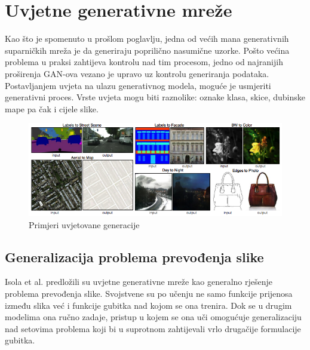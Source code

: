 \documentclass[lmodern, utf8, seminar]{fer}
\begin{document}


\chapter{Uvjetne generativne mreže}
Kao što je spomenuto u prošlom poglavlju, jedna od većih mana generativnih suparničkih mreža je da generiraju poprilično nasumične uzorke. Pošto većina problema u praksi zahtijeva kontrolu nad tim procesom, jedno od najranijih proširenja GAN-ova vezano je upravo uz kontrolu generiranja podataka. Postavljanjem uvjeta na ulazu generativnog modela, moguće je usmjeriti generativni proces. Vrste uvjeta mogu biti raznolike: oznake klasa, skice, dubinske mape pa čak i cijele slike.

\begin{figure}[H]
    \centering
    \includegraphics[width=1\textwidth]{isola2017-conditioned-generation}
    \caption{Primjeri uvjetovane generacije}
    \label{fig:isola2017-conditioned-generation}
\end{figure}


\section{Generalizacija problema prevođenja slike}
Isola et al. \cite{isola2017image} predložili su uvjetne generativne mreže kao generalno rješenje problema prevođenja slike. Svojstvene su po učenju ne samo funkcije prijenosa između slika već i funkcije gubitka nad kojom se ona trenira.
Dok se u drugim modelima ona ručno zadaje, pristup u kojem se ona uči omogućuje generalizaciju nad setovima problema koji bi u suprotnom zahtijevali vrlo drugačije formulacije gubitka.
\newline
\end{document}
